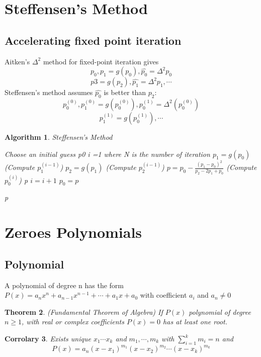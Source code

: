 \documentclass[12pt]{article}
\newtheorem{theorem}{Theorem}[subsection]
\newtheorem{cor}[theorem]{Corrolary}
\newtheorem{alg}[theorem]{Algorithm}
\begin{document}
\section{Steffensen's Method}
\subsection{Accelerating fixed point iteration}
Aitken's $\Delta^2$ method for fixed-point iteration gives $$p_0, p_1 = g(p_0), \hat{p_0} = \Delta^2p_0$$ $$p3 = g(p_2), \hat{p_1} = \Delta^2p_1, \cdots$$
Steffensen's method assumes $\hat{p_0}$ is better than $p_2$: 
$$p_0^{(0)}, p_1^{(0)} = g(p_0^{(0)}), p_0^{(1)} = \Delta^2(p_0^{(0)})$$ $$p_1^{(1)} = g(p_0^{(1)}), \cdots$$
\begin{alg}{Steffensen's Method}
	\begin{algorithmic}
	Choose an initial guess p0
	\State i =1
	 where N is the number of iteration
		\State $p_1 = g(p_0)$ (Compute $p_1^{(i-1)}$)
		\State $p_2 = g(p_1)$ (Compute $p_2^{(i-1)}$)
		\State $p = p_0 - \frac{(p_1 - p_0)^2}{p_2 - 2p_1 + p_0}$ (Compute $p_0^{(i)}$)
			\State \Return p
		\EndIf
		\State $i = i+1$
		\State $p_0 = p$
		
	\EndWhile
	\State \Return p	
	\end{algorithmic}

\end{alg}


\section{Zeroes Polynomials}

\subsection{Polynomial}
A polynomial of degree n has the form $P(x) = a_nx^n +a_{n-1}x^{n-1} + \cdots +a_1x + a_0$ with coefficient $a_i$ and $a_n \neq 0$
\begin{theorem}{(Fundamental Theorem of Algebra)}
\newline If $P(x)$ polynomial of degree $n \geq 1$, with real or complex coefficients $P(x) = 0$ has at least one root. 	
\end{theorem} 

\begin{cor}
	Exists unique $x_1 \cdots x_k$ and $m_1,\cdots, m_k$ with $\sum_{i=1}^k m_i = n$ and $$P(x) = a_n(x-x_1)^{m_1}(x-x_2)^{m_2}\cdots (x-x_k)^{m_k}$$
\end{cor}
\end{document}
